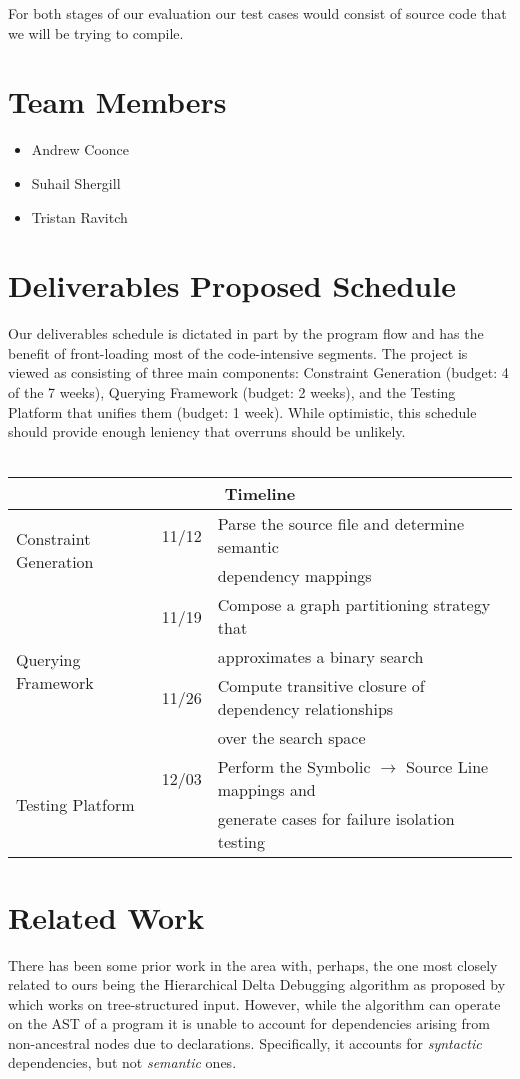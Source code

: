\documentclass[11pt]{article}
\begin{document}
For both stages of our evaluation our test cases would consist of source code
that we will be trying to compile.

\section{Team Members}
\begin{itemize}
\item{Andrew Coonce}
\item{Suhail Shergill}
\item{Tristan Ravitch}
\end{itemize}

\section{Deliverables Proposed Schedule}
Our deliverables schedule is dictated in part by the program flow and has the
benefit of front-loading most of the code-intensive segments. The project is
viewed as consisting of three main components: Constraint Generation (budget: 4
of the 7 weeks), Querying Framework (budget: 2 weeks), and the Testing Platform
that unifies them (budget: 1 week). While optimistic, this schedule should
provide enough leniency that overruns should be unlikely.  \\ \\
\begin{tabular}{|l|l|l|}
\hline
\multicolumn{3}{|c|}{Timeline} \\
\hline
\multirow{2}{*}{Constraint Generation} & 11/12 &
Parse the source file and determine semantic \\
 & & dependency mappings \\ \hline
\multirow{4}{*}{Querying Framework} & 11/19 & Compose a graph partitioning
strategy that \\
 & & approximates a binary search \\
 & 11/26 & Compute transitive closure of dependency relationships \\
 & & over the search space \\ \hline
\multirow{2}{*}{Testing Platform} & 12/03 & Perform the Symbolic $\rightarrow$
Source Line mappings and \\
 & & generate cases for failure isolation testing \\ \hline
\end{tabular}



\section{Related Work}
There has been some prior work in the area with, perhaps, the one most closely
related to ours being the Hierarchical Delta Debugging algorithm as proposed by
\citet{hdd} which works on tree-structured input. However, while
the algorithm can operate on the AST of a program it is unable to account for
dependencies arising from non-ancestral nodes due to declarations. Specifically,
it accounts for \emph{syntactic} dependencies, but not \emph{semantic} ones.
\end{document}
